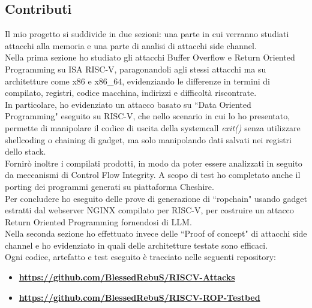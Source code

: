 \subsection*{Contributi}
Il mio progetto si suddivide in due sezioni: una parte in cui verranno studiati attacchi alla memoria e una parte di analisi di attacchi side channel.\\
\newline
Nella prima sezione ho studiato gli attacchi Buffer Overflow e Return Oriented Programming su ISA RISC-V, paragonandoli agli stessi attacchi ma su architetture come x86 e x86\_64, evidenziando le differenze in termini di compilato, registri, codice macchina, indirizzi e difficoltà riscontrate.\\
In particolare, ho evidenziato un attacco basato su ``Data Oriented Programming" eseguito su RISC-V, che nello scenario in cui lo ho presentato, permette di manipolare il codice di uscita della systemcall \textit{exit()} senza utilizzare shellcoding o chaining di gadget, ma solo manipolando dati salvati nei registri dello stack.\\
Fornirò inoltre i compilati prodotti, in modo da poter essere analizzati in seguito da meccanismi di Control Flow Integrity. A scopo di test ho completato anche il porting dei programmi generati su piattaforma Cheshire.\\
Per concludere ho eseguito delle prove di generazione di ``ropchain" usando gadget estratti dal webserver NGINX compilato per RISC-V, per costruire un attacco Return Oriented Programming fornendosi di LLM.\\
\newline
Nella seconda sezione ho effettuato invece delle ``Proof of concept" di attacchi side channel e ho evidenziato in quali delle architetture testate sono efficaci.\\
\newline
Ogni codice, artefatto e test eseguito è tracciato nelle seguenti repository:\\
\begin{itemize}
    \item \href{https://github.com/BlessedRebuS/RISCV-Attacks}{\textbf{https://github.com/BlessedRebuS/RISCV-Attacks}}
    \item \href{https://github.com/BlessedRebuS/RISCV-ROP-Testbed}{\textbf{https://github.com/BlessedRebuS/RISCV-ROP-Testbed}}
\end{itemize}
